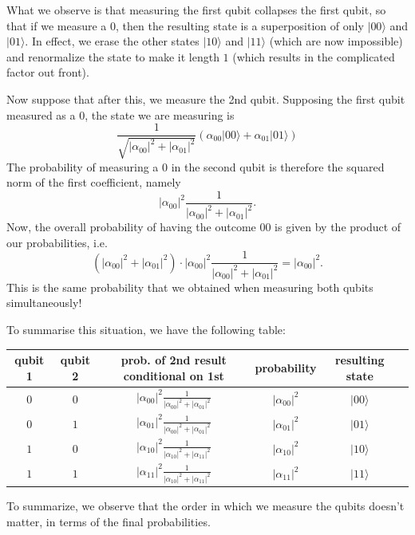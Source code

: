 \documentclass{article}
\theoremstyle{plain}
\theoremstyle{definition}
\theoremstyle{remark}
\numberwithin{theorem}{section}
\begin{document}
What we observe is that measuring the first qubit collapses the first qubit, so that if we measure a $0$, then the resulting state is a superposition of only $|00\rangle$ and $|01\rangle$.  In effect, we erase the other states $|10\rangle$ and $|11\rangle$ (which are now impossible) and renormalize the state to make it length $1$ (which results in the complicated factor out front).

Now suppose that after this, we measure the 2nd qubit.  Supposing the first qubit measured as a $0$, the state we are measuring is 
\[
\frac{1}{\sqrt{|\alpha_{00}|^2+|\alpha_{01}|^2}}\left(\alpha_{00}|00 \rangle+\alpha_{01}|01 \rangle\right)
\]
The probability of measuring a $0$ in the second qubit is therefore the squared norm of the first coefficient, namely
\[
|\alpha_{00}|^2\frac{1}{|\alpha_{00}|^2+|\alpha_{01}|^2}.
\]
Now, the overall probability of having the outcome $00$ is given by the product of our probabilities, i.e. 
\[
\left(|\alpha_{00}|^2+|\alpha_{01}|^2 \right) \cdot |\alpha_{00}|^2\frac{1}{|\alpha_{00}|^2+|\alpha_{01}|^2}
= |\alpha_{00}|^2.
\]
This is the same probability that we obtained when measuring both qubits simultaneously!

To summarise this situation, we have the following table:

\vspace{1em}

\begin{center}

\begin{tabular}{cccccc}
qubit 1 & qubit 2 & prob. of 2nd result conditional on 1st & probability & resulting state \\
\hline
$0$ & $0$ &  $|\alpha_{00}|^2\frac{1}{|\alpha_{00}|^2+|\alpha_{01}|^2}$ & $|\alpha_{00}|^2$ & $|00\rangle$ \\
$0$ & $1$ &  $|\alpha_{01}|^2\frac{1}{|\alpha_{00}|^2+|\alpha_{01}|^2}$ & $|\alpha_{01}|^2$ & $|01\rangle$ \\
$1$ & $0$ &  $|\alpha_{10}|^2\frac{1}{|\alpha_{10}|^2+|\alpha_{11}|^2}$ & $|\alpha_{10}|^2$ & $|10\rangle$ \\
$1$ & $1$ &  $|\alpha_{11}|^2\frac{1}{|\alpha_{10}|^2+|\alpha_{11}|^2}$ & $|\alpha_{11}|^2$ & $|11\rangle$ \\
\end{tabular}

\end{center}
\vspace{1em}

To summarize, we observe that the order in which we measure the qubits doesn't matter, in terms of the final probabilities.
\end{document}

